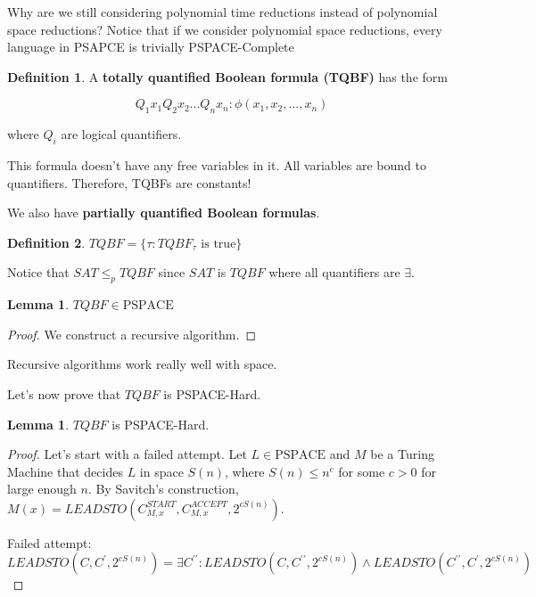 \documentclass{article}
\theoremstyle{definition}
\newtheorem{definition}{Definition}
\newtheorem{lemma}[theorem]{Lemma}
\begin{document}
Why are we still considering polynomial time reductions instead of polynomial space reductions? Notice that if we consider polynomial space reductions, every language in PSAPCE is trivially PSPACE-Complete 

\begin{definition}
    A \textbf{totally quantified Boolean formula (TQBF)} has the form 

    \[ Q_{1}x_{1}Q_{2}x_{2}...Q_{n}x_{n}: \phi(x_{1},x_{2},...,x_{n})\]

    where $Q_{i}$ are logical quantifiers.
\end{definition}

This formula doesn't have any free variables in it. All variables are bound to quantifiers. Therefore, TQBFs are constants!

We also have \textbf{partially quantified Boolean formulas}.

\begin{definition}
    $TQBF = \{ \tau: TQBF_{\tau} \text{ is true} \}$
\end{definition}

Notice that $SAT \leq_{p} TQBF$ since $SAT$ is $TQBF$ where all quantifiers are $\exists$.

\begin{lemma}
    $TQBF \in \text{PSPACE}$
\end{lemma}
\begin{proof}
    We construct a recursive algorithm.

    
\end{proof}

Recursive algorithms work really well with space.

Let's now prove that $TQBF$ is PSPACE-Hard.

\begin{lemma}
    $TQBF$ is PSPACE-Hard.
\end{lemma}
\begin{proof}
    Let's start with a failed attempt. Let $L \in \text{PSPACE}$ and $M$ be a Turing Machine that decides $L$ in space $S(n)$, where $S(n) \leq n^{c}$ for some $c > 0$ for large enough $n$. By Savitch's construction, $M(x) = LEADSTO(C^{START}_{M,x},C^{ACCEPT}_{M,x},2^{cS(n)})$. 

    Failed attempt: \[LEADSTO(C,C^{\prime}, 2^{cS(n)}) = \exists C^{\prime\prime}: LEADSTO(C,C^{\prime\prime}, 2^{cS(n)}) \land LEADSTO(C^{\prime\prime},C^{\prime}, 2^{cS(n)}) \]
\end{proof}
\end{document}
